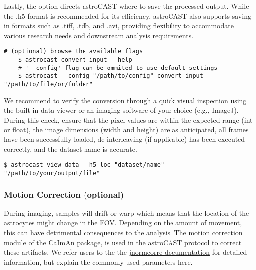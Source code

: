 Lastly, the  option directs astroCAST where to save the processed output. While the .h5 format is recommended for its efficiency, astroCAST also supports saving in formats such as .tiff, .tdb, and .avi, providing flexibility to accommodate various research needs and downstream analysis requirements.

\begin{lstlisting}[style=bashStyle]
    # (optional) browse the available flags
    $ astrocast convert-input --help
    # '--config' flag can be ommited to use default settings
    $ astrocast --config "/path/to/config" convert-input "/path/to/file/or/folder"
\end{lstlisting}

We recommend to verify the conversion through a quick visual inspection using the built-in data viewer or an imaging software of your choice (e.g., ImageJ). During this check, ensure that the pixel values are within the expected range (int or float), the image dimensions (width and height) are as anticipated, all frames have been successfully loaded, de-interleaving (if applicable) has been executed correctly, and the dataset name is accurate.

\begin{lstlisting}[style=bashStyle]
    $ astrocast view-data --h5-loc "dataset/name" "/path/to/your/output/file"
\end{lstlisting}

\subsubsection{Motion Correction (optional)}

During imaging, samples will drift or warp which means that the location of the astrocytes might change in the \ac{FOV}. Depending on the amount of movement, this can have detrimental consequences to the analysis. The motion correction module of the \href{https://github.com/flatironinstitute/CaImAn}{CaImAn} package\citep{giovannucci_caiman_2019}, is used in the astroCAST protocol to correct these artifacts. We refer users to the the \href{https://jnormcorre.readthedocs.io/en/latest/Algo.html#motion-correction-methods}{jnormcorre documentation} for detailed information, but explain the commonly used parameters here.

